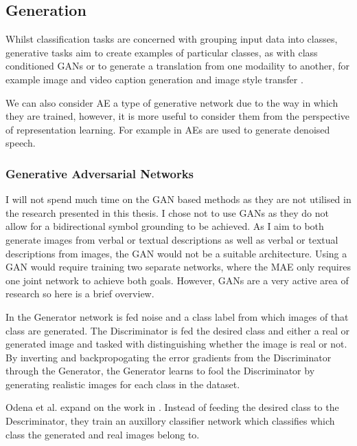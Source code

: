 \subsection{Generation}
Whilst classification tasks are concerned with grouping input data into classes, generative tasks aim to create examples of particular classes, as with class conditioned \acp{GAN} \cite{mirza2014conditional, odena2017conditional} or to generate a translation from one modaility to another, for example image and video caption generation \cite{vinyals2015show, lebret2015phrase, donahue2015long, jia2015guiding, rohrbach2014coherent, rohrbach2013translating, yao2015describing, yao2015video, venugopalan2014translating, johnson2016densecap, ordonez2011im2text, sheppard2016video} and image style transfer \cite{zhu2017unpaired}.

We can also consider \ac{AE} a type of generative network due to the way in which they are trained, however, it is more useful to consider them from the perspective of representation learning. For example in \cite{lu2013speech} \acp{AE} are used to generate denoised speech.

\subsubsection{Generative Adversarial Networks}
I will not spend much time on the \ac{GAN} based methods as they are not utilised in the research presented in this thesis. I chose not to use \acp{GAN} as they do not allow for a bidirectional symbol grounding to be achieved. As I aim to both generate images from verbal or textual descriptions as well as verbal or textual descriptions from images, the \ac{GAN} would not be a suitable architecture. Using a \ac{GAN} would require training two separate networks, where the \ac{MAE} only requires one joint network to achieve both goals. However, \acp{GAN} are a very active area of research so here is a brief overview. 

In \cite{mirza2014conditional} the Generator network is fed noise and a class label from which images of that class are generated. The Discriminator is fed the desired class and either a real or generated image and tasked with distinguishing whether the image is real or not. By inverting and backpropogating the error gradients from the Discriminator through the Generator, the Generator learns to fool the Discriminator by generating realistic images for each class in the dataset.

Odena et al. \cite{odena2017conditional} expand on the work in \cite{mirza2014conditional}. Instead of feeding the desired class to the Descriminator, they train an auxillory classifier network which classifies which class the generated and real images belong to.

